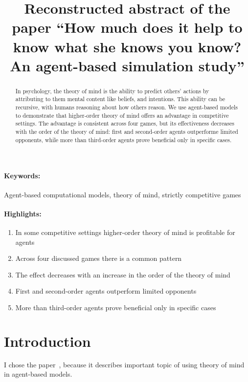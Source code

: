 \documentclass[12pt]{article}
\title{Reconstructed abstract of the paper ``How much does it help to know what she knows you know? An agent-based simulation study''}
\date{}
\begin{document}
\maketitle

\begin{abstract}

In psychology, the theory of mind is the ability to predict others' actions by attributing to them mental content like beliefs, and intentions. This ability can be recursive, with humans reasoning about how others reason. We use agent-based models to demonstrate that higher-order theory of mind offers an advantage in competitive settings. The advantage is consistent across four games, but its effectiveness decreases with the order of the theory of mind: first and second-order agents outperforme limited opponents, while more than third-order agents prove beneficial only in specific cases.
\end{abstract}
\paragraph{Keywords:} Agent-based computational models, theory of mind, strictly competitive games

\paragraph{Highlights:}
\begin{enumerate}
\item In some competitive settings higher-order theory of mind is profitable for agents
\item Across four discussed games there is a common pattern
\item The effect decreases with an increase in the order of the theory of mind
\item First and second-order agents outperform limited opponents
\item More than third-order agents prove beneficial only in specific cases
\end{enumerate}

\section{Introduction}
I chose the paper~\cite{DEWEERD201367}, because it describes important topic of using theory of mind in agent-based models. 



\end{document}

